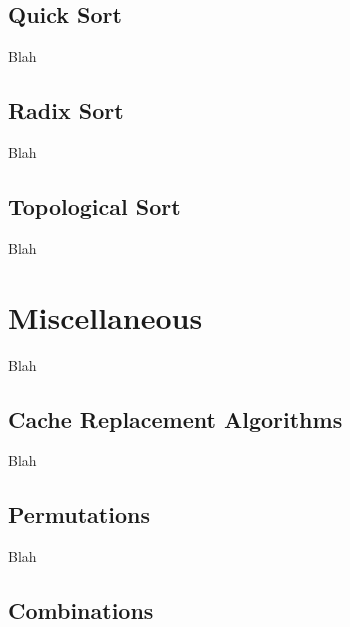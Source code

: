 
\subsection{Quick Sort}

Blah


\subsection{Radix Sort}

Blah


\subsection{Topological Sort}

Blah \\


\toclineskip
\section{Miscellaneous}

Blah


\subsection{Cache Replacement Algorithms}

Blah


\subsection{Permutations}

Blah


\subsection{Combinations}

